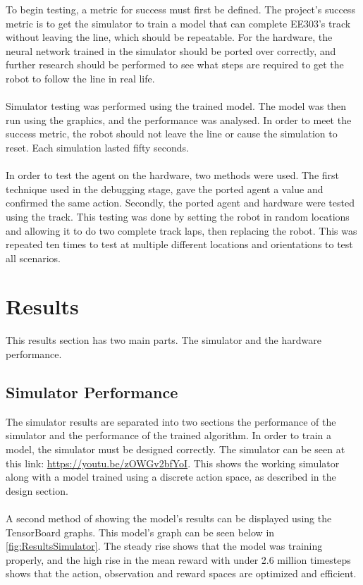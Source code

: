 \documentclass[a4paper,12pt]{article}
\begin{document}
To begin testing, a metric for success must first be defined. The project's success metric is to get the simulator to train a model that can complete EE303's track without leaving the line, which should be repeatable. For the hardware, the neural network trained in the simulator should be ported over correctly, and further research should be performed to see what steps are required to get the robot to follow the line in real life.
\\\\
Simulator testing was performed using the trained model. The model was then run using the graphics, and the performance was analysed. In order to meet the success metric, the robot should not leave the line or cause the simulation to reset. Each simulation lasted fifty seconds.
\\\\
In order to test the agent on the hardware, two methods were used. The first technique used in the debugging stage, gave the ported agent a value and confirmed the same action. Secondly, the ported agent and hardware were tested using the track. This testing was done by setting the robot in random locations and allowing it to do two complete track laps, then replacing the robot. This was repeated ten times to test at multiple different locations and orientations to test all scenarios. 

\section{Results}

This results section has two main parts. The simulator and the hardware performance.

\subsection{Simulator Performance}
The simulator results are separated into two sections the performance of the simulator and the performance of the trained algorithm. In order to train a model, the simulator must be designed correctly. The simulator can be seen at this link: \url{https://youtu.be/zOWGv2bfYoI}. This shows the working simulator along with a model trained using a discrete action space, as described in the design section. 
\\\\
A second method of showing the model's results can be displayed using the TensorBoard graphs. This model's graph can be seen below in \autoref{fig:ResultsSimulator}. The steady rise shows that the model was training properly, and the high rise in the mean reward with under 2.6 million timesteps shows that the action, observation and reward spaces are optimized and efficient. 
\end{document}
